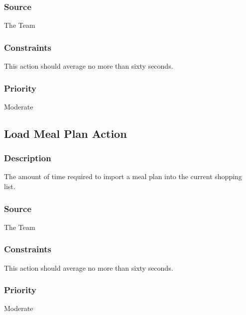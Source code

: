 \subsubsection{Source}
The Team
\subsubsection{Constraints}
This action should average no more than sixty seconds.
\subsubsection{Priority}
Moderate

\subsection{Load Meal Plan Action}
\subsubsection{Description}
The amount of time required to import a meal plan into the current shopping list.
\subsubsection{Source}
The Team
\subsubsection{Constraints}
This action should average no more than sixty seconds.
\subsubsection{Priority}
Moderate